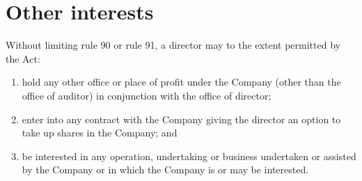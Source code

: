 \section{Other interests}

Without limiting rule 90 or rule 91, a director may to the extent permitted by the Act:

\begin{enumerate}[label=(\alph*)]
    \item hold any other office or place of profit under the Company (other than the office of auditor) in conjunction with the office of director;
    
    \item enter into any contract with the Company giving the director an option to take up shares in the Company; and
    
    \item be interested in any operation, undertaking or business undertaken or assisted by the Company or in which the Company is or may be interested.
\end{enumerate} 